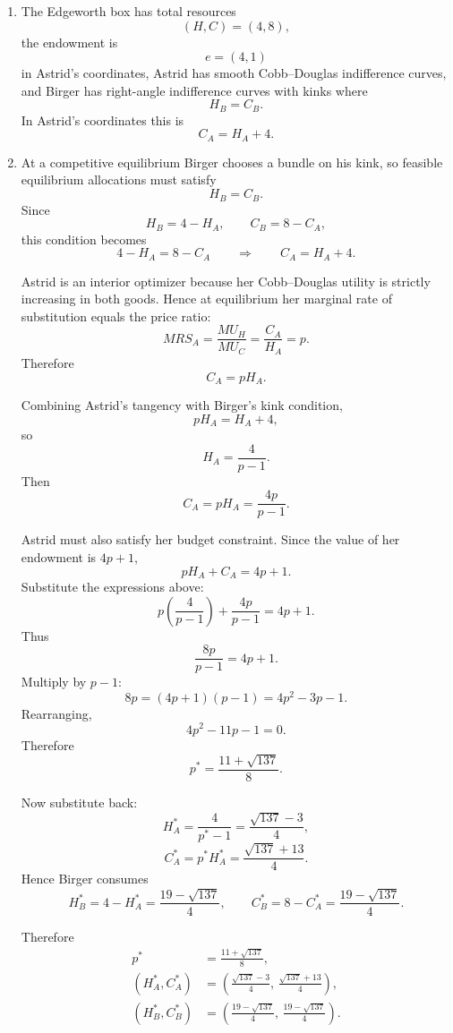 \documentclass[12pt]{article}
\begin{document}
\begin{enumerate}[label=(\alph*)]
    \item
    The Edgeworth box has total resources
    \[
    (H,C)=(4,8),
    \]
    the endowment is
    \[
    e=(4,1)
    \]
    in Astrid's coordinates, Astrid has smooth Cobb--Douglas indifference curves, and Birger has right-angle indifference curves with kinks where
    \[
    H_B=C_B.
    \]
    In Astrid's coordinates this is
    \[
    \boxed{C_A=H_A+4.}
    \]

    \item
    At a competitive equilibrium Birger chooses a bundle on his kink, so feasible equilibrium allocations must satisfy
    \[
    H_B=C_B.
    \]
    Since
    \[
    H_B=4-H_A,\qquad C_B=8-C_A,
    \]
    this condition becomes
    \[
    4-H_A = 8-C_A
    \qquad\Longrightarrow\qquad
    \boxed{C_A=H_A+4.}
    \]

    Astrid is an interior optimizer because her Cobb--Douglas utility is strictly increasing in both goods. Hence at equilibrium her marginal rate of substitution equals the price ratio:
    \[
    MRS_A=\frac{MU_H}{MU_C}=\frac{C_A}{H_A}=p.
    \]
    Therefore
    \[
    \boxed{C_A=pH_A.}
    \]

    Combining Astrid's tangency with Birger's kink condition,
    \[
    pH_A=H_A+4,
    \]
    so
    \[
    H_A=\frac{4}{p-1}.
    \]
    Then
    \[
    C_A=pH_A=\frac{4p}{p-1}.
    \]

    Astrid must also satisfy her budget constraint. Since the value of her endowment is \(4p+1\),
    \[
    pH_A+C_A=4p+1.
    \]
    Substitute the expressions above:
    \[
    p\left(\frac{4}{p-1}\right)+\frac{4p}{p-1}=4p+1.
    \]
    Thus
    \[
    \frac{8p}{p-1}=4p+1.
    \]
    Multiply by \(p-1\):
    \[
    8p=(4p+1)(p-1)=4p^2-3p-1.
    \]
    Rearranging,
    \[
    4p^2-11p-1=0.
    \]
    Therefore
    \[
    p^{*}=\frac{11+\sqrt{137}}{8}.
    \]

    Now substitute back:
    \[
    H_A^{*}=\frac{4}{p^{*}-1}=\frac{\sqrt{137}-3}{4},
    \]
    \[
    C_A^{*}=p^{*}H_A^{*}=\frac{\sqrt{137}+13}{4}.
    \]
    Hence Birger consumes
    \[
    H_B^{*}=4-H_A^{*}=\frac{19-\sqrt{137}}{4},
    \qquad
    C_B^{*}=8-C_A^{*}=\frac{19-\sqrt{137}}{4}.
    \]

    Therefore
\begin{equation*}
    \boxed{
    \begin{aligned}
        p^{*} &= \frac{11+\sqrt{137}}{8}, \\
        (H_A^{*},C_A^{*}) &= \left(\frac{\sqrt{137}-3}{4},\,\frac{\sqrt{137}+13}{4}\right), \\
        (H_B^{*},C_B^{*}) &= \left(\frac{19-\sqrt{137}}{4},\,\frac{19-\sqrt{137}}{4}\right).
    \end{aligned}
    }
\end{equation*}




\end{enumerate}
\end{document}
